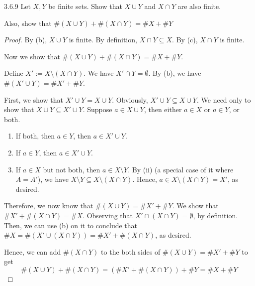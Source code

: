 \begin{exercise}{3.6.9}
	Let $X,Y$ be finite sets. Show that $X \cup Y$ and $X \cap Y$ are also finite.
	
	Also, show that $\#(X \cup Y) + \#(X \cap Y) = \#X + \#Y$
\end{exercise}
\begin{proof}
	By  (b), $X \cup Y$ is finite. By definition, $X \cap Y \subseteq X$. By  (c), $X \cap Y$ is finite.
	
	Now we show that $\#(X \cup Y) + \#(X \cap Y) = \#X + \#Y$.
	
	Define $X' := X \setminus (X \cap Y)$. We have $X' \cap Y = \emptyset$. By  (b), we have $\#(X' \cup Y) = \#X' + \#Y$.
	
	First, we show that $X' \cup Y = X \cup Y$. Obviously, $X' \cup Y \subseteq X \cup Y$. We need only to show that $X \cup Y \subseteq X' \cup Y$. Suppose $a \in X \cup Y$, then either $a \in X$ or $a \in Y$, or both.
	\begin{enumerate}
		\item If both, then $a \in Y$, then $a \in X' \cup Y$.
		\item If $a \in Y$, then $a \in X' \cup Y$.
		\item If $a \in X$ but not both, then $a \in X \setminus Y$. By  (ii) (a special case of it where $A = A'$), we have $X \setminus Y \subseteq X \setminus (X \cap Y)$. Hence, $a \in X \setminus (X \cap Y) = X'$, as desired.
	\end{enumerate}

	Therefore, we now know that $\#(X \cup Y) = \#X' + \#Y$. We show that $\#X' + \#(X \cap Y) = \#X$. Observing that $X' \cap (X \cap Y) = \emptyset$, by definition. Then, we can use  (b) on it to conclude that $\#X = \#(X' \cup (X \cap Y)) = \#X' + \#(X \cap Y)$, as desired.

	Hence, we can add $\#(X \cap Y)$ to the both sides of $\#(X \cup Y) = \#X' + \#Y$ to get 
	\[
		\#(X \cup Y) + \#(X \cap Y) = (\#X' + \#(X \cap Y)) + \#Y = \#X + \#Y 
	\]
\end{proof}

